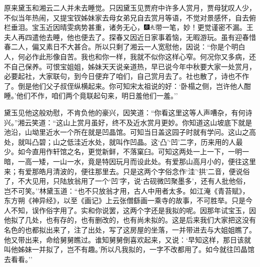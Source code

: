 原来黛玉和湘云二人并未去睡觉。只因黛玉见贾府中许多人赏月，贾母犹叹人少，不似当年热闹，又提宝钗姊妹家去母女弟兄自去赏月等语，不觉对景感怀，自去俯栏垂泪。宝玉近因晴雯病势甚重，诸务无心，{\includegraphics[width=3mm]{../Images/00004}\includegraphics[width=3mm]{../Images/00012}\footnotesize \kaishu 带一笔，妙！更觉谨密不漏。}王夫人再四遣他去睡，他也便去了。探春又因近日家事着恼，无暇游玩。虽有迎春惜春二人，偏又素日不大甚合。所以只剩了湘云一人宽慰他，因说：``你是个明白人，何必作此形像自苦。我也和你一样，我就不似你这样心窄。何况你又多病，还不自己保养。可恨宝姐姐，姊妹天天说亲道热，早已说今年中秋要大家一处赏月，必要起社，大家联句，到今日便弃了咱们，自己赏月去了。社也散了，诗也不作了。倒是他们父子叔侄纵横起来。你可知宋太祖说的好：`卧榻之侧，岂许他人酣睡。'他们不作，咱们两个竟联起句来，明日羞他们一羞。''

黛玉见他这般劝慰，不肯负他的豪兴，因笑道：``你看这里这等人声嘈杂，有何诗兴。''湘云笑道：``这山上赏月虽好，终不及近水赏月更妙。你知道这山坡底下就是池沿，山坳里近水一个所在就是凹晶馆。可知当日盖这园子时就有学问。这山之高处，就叫凸碧；山之低洼近水处，就叫作凹晶。这`凸'`凹'二字，历来用的人最少。如今直用作轩馆之名，更觉新鲜，不落窠臼。可知这两处一上一下，一明一暗，一高一矮，一山一水，竟是特因玩月而设此处。有爱那山高月小的，便往这里来；有爱那皓月清波的，便往那里去。只是这两个字俗念作`洼'`拱'二音，便说俗了，不大见用，只陆放翁用了一个`凹'字，说`古砚微凹聚墨多'，还有人批他俗，岂不可笑。''林黛玉道：``也不只放翁才用，古人中用者太多。如江淹《青苔赋》，东方朔《神异经》，以至《画记》上云张僧繇画一乘寺的故事，不可胜举。只是今人不知，误作俗字用了。实和你说罢，这两个字还是我拟的呢。因那年试宝玉，因他拟了几处，也有存的，也有删改的，也有尚未拟的。这是后来我们大家把这没有名色的也都拟出来了，注了出处，写了这房屋的坐落，一并带进去与大姐姐瞧了。他又带出来，命给舅舅瞧过。谁知舅舅倒喜欢起来，又说：`早知这样，那日该就叫他姊妹一并拟了，岂不有趣。'所以凡我拟的，一字不改都用了。如今就往凹晶馆去看看。''

